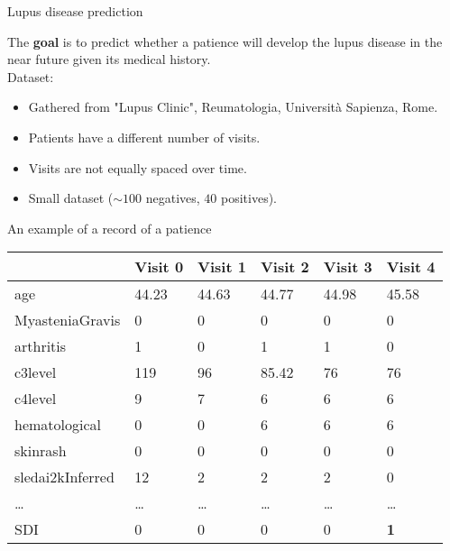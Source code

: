 

\begin{frame}{Lupus disease prediction}

	The \textbf{goal} is to predict whether a patience will develop the lupus disease in the near future given its medical history.
	\vspace{2em}\\
	Dataset:
	\begin{itemize}
		\item Gathered from "Lupus Clinic", Reumatologia, Università Sapienza, Rome.
		\item Patients have a different number of visits.
		\item Visits are not equally spaced over time.
		\item Small dataset ($\sim100$ negatives, $40$ positives).
	\end{itemize}

\end{frame}

\begin{frame}{An example of a record of a patience}
\begin{table}[H]
	\centering
	\begin{tabular}{ C{2.5cm} | C{1cm} C{1cm} C{1cm} C{1cm} C{1cm}}
		& Visit 0 & Visit 1 & Visit 2 & Visit 3 & Visit 4 \\
		\hline
		age & 44.23 & 44.63 & 44.77 & 44.98 & 45.58 \\
		MyasteniaGravis & 0 & 0 & 0 & 0 & 0 \\
		arthritis & 1 & 0 & 1 & 1 & 0 \\
		c3level & 119 & 96 & 85.42 & 76 & 76 \\
		c4level & 9 & 7 & 6 & 6 & 6 \\
		hematological & 0 & 0 & 6 & 6 & 6 \\
		skinrash & 0 & 0 & 0 & 0 & 0 \\
		sledai2kInferred & 12 & 2 & 2 & 2 & 0 \\
		\dots & \dots & \dots & \dots & \dots & \dots \\
		\hline
		SDI & 0 & 0 & 0 & 0 & \textbf{1}\\
	\end{tabular}
\end{table}	
\end{frame}


